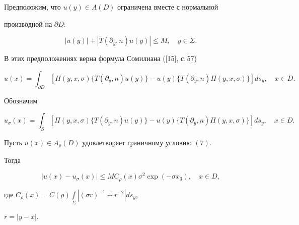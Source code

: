  


 


Предположим, что $u(y)\in A(D)$ ограничена вместе с нормальной 


производной на $\partial D$: 


\begin{equation} 


|u(y)|+|T(\partial_y,n)u(y)|\le M,\quad y\in\Sigma. 


\end{equation} 


В этих предположениях верна формула Сомилиана ([15], с.\,57) 


\begin{equation} 


u(x)=\int_{\partial D}[\Pi(y,x,\sigma)\{T(\partial_y,n)u(y)\}- 


u(y)\{T(\partial_y,n)\Pi(y,x,\sigma)\}]ds_y,\quad x\in D. 


\end{equation} 


Обозначим 


\begin{equation} 


u_\sigma(x)=\int_S[\Pi(y,x,\sigma)\{T(\partial_y,n)u(y)\}- 


u(y)\{T(\partial_y,n)\Pi(y,x,\sigma)\}]ds_y,\quad x\in D. 


\end{equation} 


 


 


\begin{thm} 


Пусть $u(x)\in A_\rho(D)$ удовлетворяет граничному условию $(7)$. 


Тогда 


\begin{equation} 


|u(x)-u_\sigma(x)|\le M C_\rho(x)\sigma^2\exp(-\sigma x_3), 


\quad x\in D, 


\end{equation} 


где $C_\rho(x)=C(\rho)\int\limits_\Sigma|(\sigma r)^{-1}+r^{-2}|ds_y$, 


$r=|y-x|$. 


\end{thm} 


 


